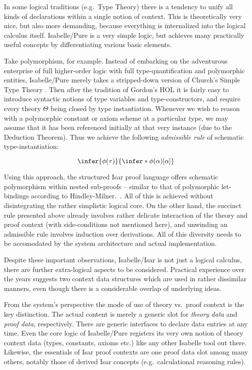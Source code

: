 \begin{isabellebody}
\begin{isamarkuptext}
In some logical traditions (e.g.\ Type Theory) there is a tendency to
unify all kinds of declarations within a single notion of context.
This is theoretically very nice, but also more demanding, because
everything is internalized into the logical calculus itself.
Isabelle/Pure is a very simple logic, but achieves many practically
useful concepts by differentiating various basic elements.

Take polymorphism, for example.  Instead of embarking on the
adventurous enterprise of full higher-order logic with full
type-quantification and polymorphic entities, Isabelle/Pure merely
takes a stripped-down version of Church's Simple Type Theory
\cite{church40}.  Then after the tradition of Gordon's HOL
\cite{mgordon-hol} it is fairly easy to introduce syntactic notions of
type variables and type-constructors, and require every theory
$\Theta$ being closed by type instantiation.  Whenever we wish to
reason with a polymorphic constant or axiom scheme at a particular
type, we may assume that it has been referenced initially at that very
instance (due to the Deduction Theorem).  Thus we achieve the
following \emph{admissible
  rule} of schematic type-instantiation:

\[
\infer{\phi(\tau)}{\infer*{\phi(\alpha)}{[\alpha]}}
\]

Using this approach, the structured Isar proof language offers
schematic polymorphism within nested sub-proofs -- similar to that of
polymorphic let-bindings according to Hindley-Milner.\
\cite{milner78}.  All of this is achieved without disintegrating the
rather simplistic logical core.  On the other hand, the succinct rule
presented above already involves rather delicate interaction of the
theory and proof context (with side-conditions not mentioned here),
and unwinding an admissible rule involves induction over derivations.
All of this diversity needs to be accomodated by the system
architecture and actual implementation.

\medskip Despite these important observations, Isabelle/Isar is not just a
logical calculus, there are further extra-logical aspects to be considered.
Practical experience over the years suggests two context data structures which
are used in rather dissimilar manners, even though there is a considerable
overlap of underlying ideas.

From the system's perspective the mode of use of theory vs.\ proof context is
the key distinction.  The actual content is merely a generic slot for
\emph{theory data} and \emph{proof data}, respectively.  There are generic
interfaces to declare data entries at any time.  Even the core logic of
Isabelle/Pure registers its very own notion of theory context data (types,
constants, axioms etc.) like any other Isabelle tool out there.  Likewise, the
essentials of Isar proof contexts are one proof data slot among many others,
notably those of derived Isar concepts (e.g.\ calculational reasoning rules).


\end{isamarkuptext}
\end{isabellebody}
